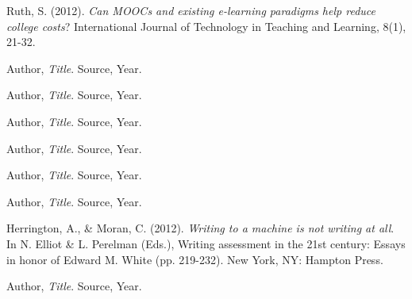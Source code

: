 \documentclass[12pt, Arial]{article}
\begin{document}
\begin{thebibliography}{9}

  Ruth, S. (2012). \emph{Can MOOCs and existing e-learning paradigms help reduce college costs}? International Journal of Technology in Teaching and Learning, 8(1), 21-32.

  Author,
  \emph{Title}.
  Source,
  Year.

  Author,
  \emph{Title}.
  Source,
  Year.

  Author,
  \emph{Title}.
  Source,
  Year.

  Author,
  \emph{Title}.
  Source,
  Year.

  Author,
  \emph{Title}.
  Source,
  Year.

  Author,
  \emph{Title}.
  Source,
  Year.

  Herrington, A., \& Moran, C. (2012). \emph{Writing to a machine is not writing at all}. In N. Elliot \& L. Perelman (Eds.), Writing assessment in the 21st century: Essays in honor of Edward M. White (pp. 219-232). New York, NY: Hampton Press.

  Author,
  \emph{Title}.
  Source,
  Year.

\end{thebibliography}
\end{document}
